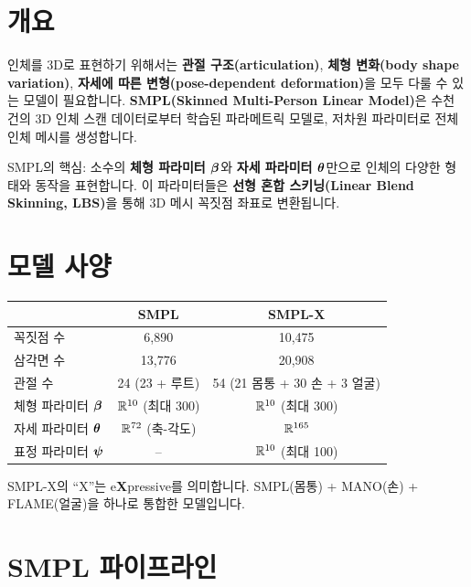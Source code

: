\documentclass[11pt, a4paper]{report}
\begin{document}
\section{개요}

인체를 3D로 표현하기 위해서는 \textbf{관절 구조(articulation)}, \textbf{체형 변화(body shape variation)}, \textbf{자세에 따른 변형(pose-dependent deformation)}을 모두 다룰 수 있는 모델이 필요합니다. \textbf{SMPL(Skinned Multi-Person Linear Model)}은 수천 건의 3D 인체 스캔 데이터로부터 학습된 파라메트릭 모델로, 저차원 파라미터로 전체 인체 메시를 생성합니다.

\begin{keyidea}
SMPL의 핵심: 소수의 \textbf{체형 파라미터 $\bm{\beta}$}와 \textbf{자세 파라미터 $\bm{\theta}$}만으로 인체의 다양한 형태와 동작을 표현합니다. 이 파라미터들은 \textbf{선형 혼합 스키닝(Linear Blend Skinning, LBS)}을 통해 3D 메시 꼭짓점 좌표로 변환됩니다.
\end{keyidea}

\section{모델 사양}

\begin{center}
\renewcommand{\arraystretch}{1.3}
\begin{tabular}{lcc}
\toprule
& \textbf{SMPL} & \textbf{SMPL-X} \\
\midrule
꼭짓점 수 & 6,890 & 10,475 \\
삼각면 수 & 13,776 & 20,908 \\
관절 수 & 24 (23 + 루트) & 54 (21 몸통 + 30 손 + 3 얼굴) \\
체형 파라미터 $\bm{\beta}$ & $\mathbb{R}^{10}$ (최대 300) & $\mathbb{R}^{10}$ (최대 300) \\
자세 파라미터 $\bm{\theta}$ & $\mathbb{R}^{72}$ (축-각도) & $\mathbb{R}^{165}$ \\
표정 파라미터 $\bm{\psi}$ & -- & $\mathbb{R}^{10}$ (최대 100) \\
\bottomrule
\end{tabular}
\end{center}

\begin{remark}
SMPL-X의 ``X''는 e\textbf{X}pressive를 의미합니다. SMPL(몸통) + MANO(손) + FLAME(얼굴)을 하나로 통합한 모델입니다.
\end{remark}


\section{SMPL 파이프라인}
\end{document}
